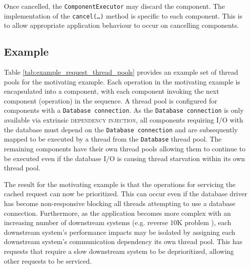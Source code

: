 \documentclass[prodmode]{style/acmlarge}
\begin{document}
Once cancelled, the \texttt{ComponentExecutor} may discard the component.  The
implementation of the \texttt{can\-cel(\ldots)} method is specific to each
component.  This is to allow appropriate application behaviour to occur on
cancelling components.


\subsection{Example}

Table \ref{tab:example_request_thread_pools} provides an example set of thread
pools for the motivating example.  Each operation in the motivating example is
encapsulated into a component, with each component invoking the next component
(operation) in the sequence.  A thread pool is configured for components with a
\texttt{Database connection}.  As the \texttt{Database connection} is only
available via extrinsic \textsc{dependency injection}, all components requiring
I/O with the database must depend on the \texttt{Database connection} and are
subsequently mapped to be executed by a thread from the \texttt{Database} thread
pool.  The remaining components have their own thread pools allowing them to
continue to be executed even if the database I/O is causing thread starvation
within its own thread pool.

\begin{table}[t]
\label{tab:example_request_thread_pools}
\end{table}

The result for the motivating example is that the operations for servicing the
cached request can now be prioritized.  This can occur even if the database
driver has become non-responsive blocking all threads attempting to use a
database connection.  Furthermore, as the application becomes more complex with
an increasing number of downstream systems (e.g. reverse 10K problem
\cite{reverse-ten-k-problem}), each downstream system's performance impacts may
be isolated by assigning each downstream system's communication dependency its
own thread pool.  This has requests that require a slow downstream system to be
deprioritized, allowing other requests to be serviced.
\end{document}
